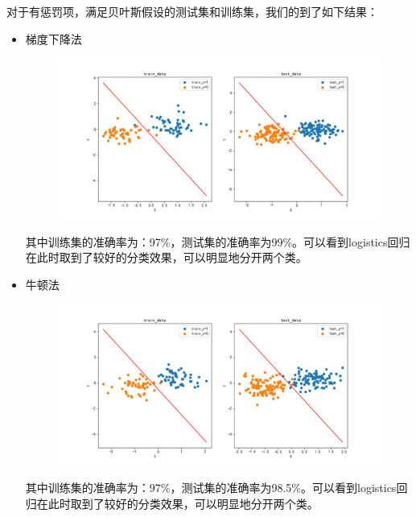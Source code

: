 \documentclass[lang=cn,a4paper,cite=authoryear]{elegantpaper}
\begin{document}
\subsubsection*{}
对于有惩罚项，满足贝叶斯假设的测试集和训练集，我们的到了如下结果：
\begin{itemize}
	\par
\item 梯度下降法
\begin{center}
	\begin{figure}[H]
		\centering
		\includegraphics[scale=0.5]{test01}
	\end{figure}
\end{center}
其中训练集的准确率为：97\%，测试集的准确率为99\%。可以看到logistics回归在此时取到了较好的分类效果，可以明显地分开两个类。
\par
\item 牛顿法
\begin{center}
	\begin{figure}[H]
		\centering
		\includegraphics[scale=0.5]{nttest01}
	\end{figure}
\end{center}
其中训练集的准确率为：97\%，测试集的准确率为98.5\%。可以看到logistics回归在此时取到了较好的分类效果，可以明显地分开两个类。

\end{itemize}
\end{document}

